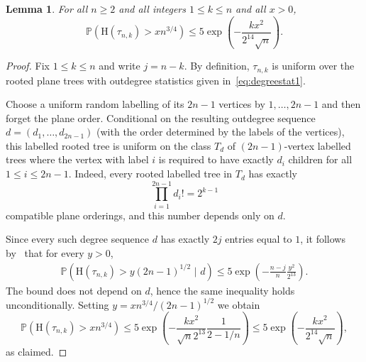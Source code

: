 \documentclass[english,11pt]{smfart}
\newcommand{\Prb}[1]{\mathbb{P}\left(#1\right)}
\newcommand{\He}{\mathrm{H}}
\newtheorem{lemma}[theorem]{Lemma}
\numberwithin{equation}{section}
\begin{document}
\begin{lemma}
	\label{le:heightk}
	For all $n \ge 2$ and all integers $1\le k\le n$ and all $x> 0$,
	\[
		\Prb{\He(\tau_{n,k}) > x n^{3/4}} \le 5\exp\left(-\frac{k x^2}{2^{14} \sqrt{n} } \right).
	\]
\end{lemma}
\begin{proof}
	Fix $1\le k\le n$ and write $j=n-k$. By definition, $\tau_{n,k}$ is uniform over the rooted plane trees with outdegree statistics given in~\eqref{eq:degreestat1}.
	\smallskip
    
	Choose a uniform random labelling of its $2n-1$ vertices by $1, \ldots, 2n-1$ and then forget the plane order. Conditional on the resulting outdegree sequence $d=(d_1,\dots,d_{2n-1})$ (with the order determined by the labels of the vertices), this labelled rooted tree is uniform on the class $T_d$ of $(2n-1)$-vertex labelled trees where the vertex with label $i$ is required to have exactly $d_i$ children for all $1 \le i \le 2n-1$. Indeed, every rooted labelled tree in $T_d$ has exactly
	\[
		\prod_{i=1}^{2n-1} d_i! = 2^{k-1}
	\]
	compatible plane orderings, and this number depends only on $d$.
	\smallskip
    
	Since every such degree sequence $d$ has exactly $2j$ entries equal to $1$, it follows by~\cite[Thm. 6]{zbMATH07940224} that for every $y>0$,
	\begin{align*}
		\Prb{\He(\tau_{n,k})> y(2n-1)^{1/2} \,\,\Big|\,\, d} \le 5\exp\left(-\frac{n-j}{n}\frac{y^2}{2^{13}}\right).
	\end{align*}
	The bound does not depend on $d$, hence the same inequality holds unconditionally. Setting $y = x n^{3/4} / (2n-1)^{1/2}$ we obtain
	\[
		\Prb{\He(\tau_{n,k}) > x n^{3/4}} \le 5\exp\left(-\frac{k x^2}{\sqrt{n} 2^{13}} \frac{1}{2-1/n}\right) \le 5\exp\left(-\frac{k x^2}{2^{14} \sqrt{n}} \right),
		\]
	as claimed.
\end{proof}
\end{document}
